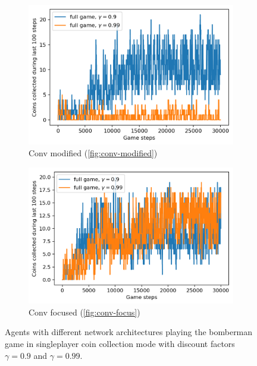
\begin{figure}
  \centering
  \begin{subfigure}[b]{0.48\linewidth}
    \centering
    	\includegraphics[width=\linewidth]{images/fullgame-conv1-4-3-arch.png}
    \caption{Conv modified (\ref{fig:conv-modified})}
    \label{fig:fullcoins-conv-mod}
  \end{subfigure}
  \quad
  \begin{subfigure}[b]{0.48\linewidth}
    \centering
      \includegraphics[width=\linewidth]{images/fullgame-focus-arch.png}
    \caption{Conv focused (\ref{fig:conv-focus})}
    \label{fig:fullcoins-conv-focus}
  \end{subfigure}
  \caption{Agents with different network architectures playing the bomberman game in singleplayer coin collection mode with discount factors $\gamma=0.9$ and $\gamma=0.99$.}
  \label{fig:fullcoins}
\end{figure}
